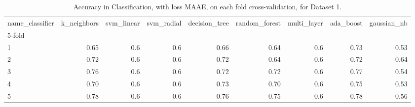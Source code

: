 \begin{table}
\centering
\caption{Accuracy in Classification, with loss MAAE, on each fold cross-validation, for Dataset 1.}
\label{table:acc-maae-boon-fold-2}
\begin{tabular}{lrrrrrrrr}
\toprule
name\_classifier &  k\_neighbors &  svm\_linear &  svm\_radial &  decision\_tree &  random\_forest &  multi\_layer &  ada\_boost &  gaussian\_nb \\
5-fold &              &             &             &                &                &              &            &              \\
\midrule
1      &         0.65 &         0.6 &         0.6 &           0.66 &           0.64 &          0.6 &       0.73 &         0.53 \\
2      &         0.72 &         0.6 &         0.6 &           0.72 &           0.64 &          0.6 &       0.72 &         0.64 \\
3      &         0.76 &         0.6 &         0.6 &           0.72 &           0.72 &          0.6 &       0.77 &         0.54 \\
4      &         0.70 &         0.6 &         0.6 &           0.73 &           0.70 &          0.6 &       0.75 &         0.53 \\
5      &         0.78 &         0.6 &         0.6 &           0.76 &           0.75 &          0.6 &       0.78 &         0.56 \\
\bottomrule
\end{tabular}
\end{table}
